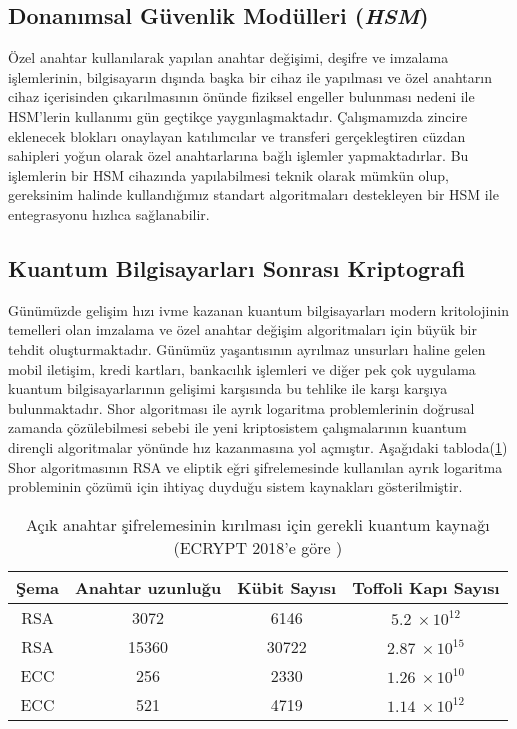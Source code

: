 \documentclass[a4paper,11pt]{article}
\begin{document}
\subsection{Donanımsal Güvenlik Modülleri (\emph{HSM})}

Özel anahtar kullanılarak yapılan anahtar değişimi, deşifre ve imzalama işlemlerinin, bilgisayarın dışında başka bir cihaz ile yapılması ve özel anahtarın cihaz içerisinden çıkarılmasının önünde fiziksel engeller bulunması nedeni ile HSM'lerin kullanımı gün geçtikçe yaygınlaşmaktadır. Çalışmamızda zincire eklenecek blokları onaylayan katılımcılar ve transferi gerçekleştiren cüzdan sahipleri yoğun olarak özel anahtarlarına bağlı işlemler yapmaktadırlar. Bu işlemlerin bir HSM cihazında yapılabilmesi teknik olarak mümkün olup, gereksinim halinde kullandığımız standart algoritmaları destekleyen bir HSM ile entegrasyonu hızlıca sağlanabilir.



\subsection{Kuantum Bilgisayarları Sonrası Kriptografi}

Günümüzde gelişim hızı ivme kazanan kuantum bilgisayarları modern kritolojinin temelleri olan imzalama ve özel anahtar değişim algoritmaları için büyük bir tehdit oluşturmaktadır. Günümüz yaşantısının ayrılmaz unsurları haline gelen mobil iletişim, kredi kartları, bankacılık işlemleri ve diğer pek çok uygulama kuantum bilgisayarlarının gelişimi karşısında bu tehlike ile karşı karşıya bulunmaktadır. Shor algoritması ile ayrık logaritma problemlerinin doğrusal zamanda çözülebilmesi sebebi ile yeni kriptosistem çalışmalarının kuantum dirençli algoritmalar yönünde hız kazanmasına yol açmıştır. Aşağıdaki tabloda(\ref{table:2}) Shor algoritmasının RSA ve eliptik eğri şifrelemesinde kullanılan ayrık logaritma probleminin çözümü için ihtiyaç duyduğu sistem kaynakları gösterilmiştir.

\begin{table}[h!]
\centering
\renewcommand*\arraystretch{1.25}
\begin{tabular}{|c|c|c|c|}
\hline
Şema & Anahtar uzunluğu & Kübit Sayısı & Toffoli Kapı Sayısı \\
\hline\hline
RSA & 3072 & 6146 & $5.2\ \times 10^{12}$ \\ \hline
RSA & 15360 & 30722 & $2.87\ \times 10^{15}$ \\ \hline
ECC & 256 & 2330 & $1.26\ \times 10^{10}$ \\ \hline
ECC & 521 & 4719 & $1.14\ \times 10^{12}$ \\
 \hline
\end{tabular}
\caption{Açık anahtar şifrelemesinin kırılması için gerekli kuantum kaynağı (ECRYPT 2018'e göre \cite{ecrypt.d5.4})}
\label{table:2}
\end{table}
\end{document}
